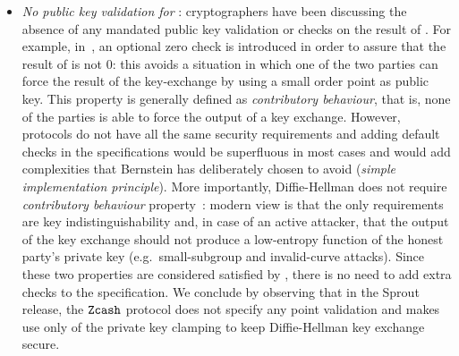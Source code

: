 \begin{itemize}
    \item \emph{No public key validation for} : cryptographers have been discussing the absence of any mandated public key validation or checks on the result of . For example, in~\cite[Section 6.1]{rfc7748}, an optional zero check is introduced in order to assure that the result of  is not $0$: this avoids a situation in which one of the two parties can force the result of the key-exchange by using a small order point as public key. This property is generally defined as \emph{contributory behaviour}, that is, none of the parties is able to force the output of a key exchange. However, protocols do not have all the same security requirements and adding default checks in the  specifications would be superfluous in most cases and would add complexities that Bernstein has deliberately chosen to avoid (\emph{simple implementation principle}). More importantly, Diffie-Hellman does not require \emph{contributory behaviour} property~\cite{trevorzerocheckcritique}: modern view is that the only requirements are key indistinguishability and, in case of an active attacker, that the output of the key exchange should not produce a low-entropy function of the honest party's private key (e.g.~small-subgroup and invalid-curve attacks). Since these two properties are considered satisfied by , there is no need to add extra checks to the  specification. We conclude by observing that in the Sprout release, the $\texttt{Zcash}{}$ protocol does not specify any point validation and makes use only of the private key clamping to keep Diffie-Hellman key exchange secure.
\end{itemize}
